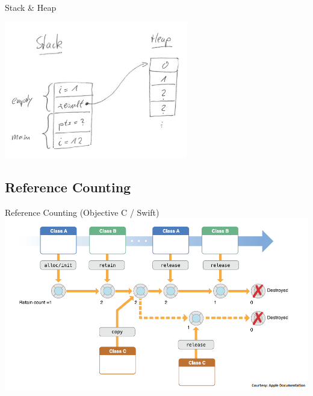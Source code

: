 \begin{Frame}{Stack \& Heap}
  \centerline{\includegraphics[width=8cm]{content/chapter_rust/stack+heap}}
\end{Frame}


\subsection{Reference Counting}

\begin{Frame}[plain]{Reference Counting (Objective C / Swift)}
  \includegraphics[width=\textwidth]{content/chapter_rust/memorymgnt_objectivec.png}
\end{Frame}


